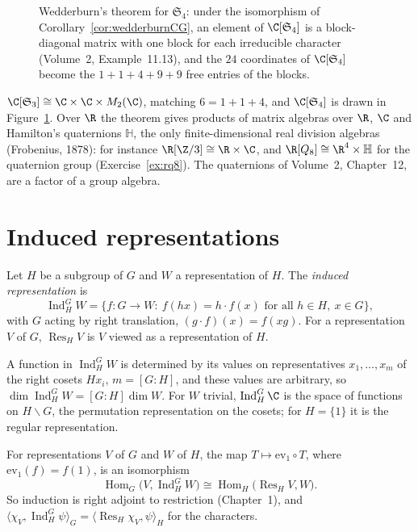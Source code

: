 \begin{figure}[ht]
\centering
{}
\caption{Wedderburn's theorem for $\mathfrak S_4$: under the isomorphism of Corollary~\ref{cor:wedderburnCG}, an element of $\C[\mathfrak S_4]$ is a block-diagonal matrix with one block for each irreducible character (Volume~2, Example~11.13), and the
$24$ coordinates of $\C[\mathfrak S_4]$ become the $1+1+4+9+9$ free entries of the blocks.}
\label{fig:wedderburn}
\end{figure}

\begin{example}\label{ex:wedderburnsmall}
$\C[\mathfrak S_3]\cong\C\times\C\times M_2(\C)$, matching $6=1+1+4$, and $\C[\mathfrak S_4]$ is drawn in Figure~\ref{fig:wedderburn}. Over $\R$ the theorem gives products of matrix algebras over $\R$, $\C$ and Hamilton's quaternions $\mathbb H$, the only finite-dimensional real
division algebras (Frobenius, 1878): for instance $\R[\Z/3]\cong\R\times\C$, and $\R[Q_8]\cong\R^4\times\mathbb H$ for the quaternion group (Exercise~\ref{ex:rq8}). The quaternions of Volume~2, Chapter~12, are a factor of a group
algebra.
\end{example}

\section{Induced representations}

\begin{definition}\label{def:induced}
Let $H$ be a subgroup of $G$ and $W$ a representation of $H$. The \emph{induced representation} is
\[
\operatorname{Ind}_H^GW=\{f\colon G\to W:\ f(hx)=h\cdot f(x)\text{ for all }h\in H,\ x\in G\},
\]
with $G$ acting by right translation, $(g\cdot f)(x)=f(xg)$. For a representation $V$ of $G$, $\operatorname{Res}_HV$ is $V$ viewed as a representation of $H$.
\end{definition}

A function in $\operatorname{Ind}_H^GW$ is determined by its values on representatives $x_1,\dots,x_m$ of the right cosets $Hx_i$, $m=[G:H]$, and these values are arbitrary, so $\dim\operatorname{Ind}_H^GW=[G:H]\dim W$.
For $W$ trivial, $\operatorname{Ind}_H^G\C$ is the space of functions on $H\backslash G$, the permutation representation on the cosets; for $H=\{1\}$ it is the regular representation.

\begin{theorem}\label{thm:frobrecip}
For representations $V$ of $G$ and $W$ of $H$, the map $T\mapsto\mathrm{ev}_1\circ T$, where $\mathrm{ev}_1(f)=f(1)$, is an isomorphism
\[
\operatorname{Hom}_G\bigl(V,\operatorname{Ind}_H^GW\bigr)\cong\operatorname{Hom}_H\bigl(\operatorname{Res}_HV,W\bigr).
\]
So induction is right adjoint to restriction (Chapter~1), and $\langle\chi_V,\operatorname{Ind}_H^G\psi\rangle_G=\langle\operatorname{Res}_H\chi_V,\psi\rangle_H$ for the characters.
\end{theorem}

